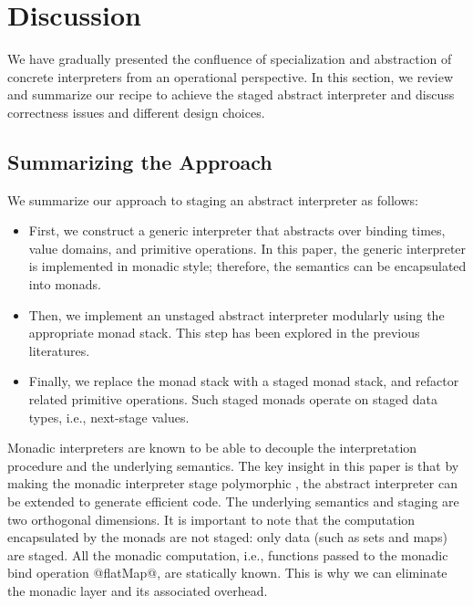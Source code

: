 \section{Discussion} \label{discussion}

We have gradually presented the confluence of specialization and abstraction of
concrete interpreters from an operational perspective.  In this section, we
review and summarize our recipe to achieve the staged abstract interpreter and
discuss correctness issues and different design choices.

\subsection{Summarizing the Approach}

We summarize our approach to staging an abstract interpreter as follows:

\begin{itemize}
  \item First, we construct a generic interpreter that abstracts over binding times,
    value domains, and primitive operations. In this paper, the generic interpreter
    is implemented in monadic style; therefore, the semantics can be encapsulated
    into monads.
  \item Then, we implement an unstaged abstract interpreter modularly using the
    appropriate monad stack. This step has been explored in the previous
    literatures.
  \item Finally, we replace the monad stack with a staged monad stack, and
    refactor related primitive operations.  Such staged monads operate on
    staged data types, i.e., next-stage values.
\end{itemize}

Monadic interpreters are known to be able to decouple the interpretation
procedure and the underlying semantics. The key insight in this paper is that
by making the monadic interpreter stage polymorphic
\cite{Ofenbeck:2017:SGP:3136040.3136060, Amin:2017:CTI:3177123.3158140}, the
abstract interpreter can be extended to generate efficient code. The
underlying semantics and staging are two orthogonal dimensions. It is important
to note that the computation encapsulated by the monads are not staged: only
data (such as sets and maps) are staged. All the monadic computation, i.e.,
functions passed to the monadic bind operation @flatMap@, are statically known.
This is why we can eliminate the monadic layer and its associated overhead.

